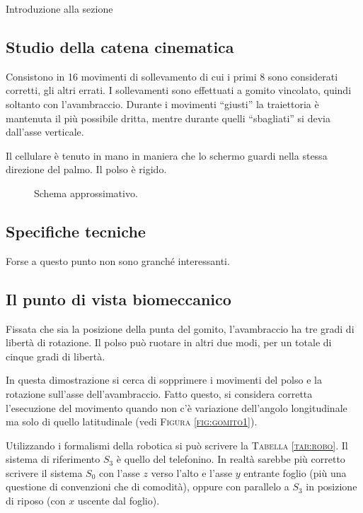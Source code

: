 Introduzione alla sezione

\subsection{Studio della catena cinematica}
\label{ssez:cat_cine}

Consistono in 16 movimenti di sollevamento
di cui i primi 8 sono considerati corretti,
gli altri errati.
I sollevamenti sono effettuati a gomito vincolato,
quindi soltanto con l'avambraccio.
Durante i movimenti ``giusti'' la traiettoria \`e mantenuta
il pi\`u possibile dritta, mentre durante quelli ``sbagliati''
si devia dall'asse verticale.

Il cellulare \`e tenuto in mano in maniera
che lo schermo guardi nella stessa direzione del palmo.
Il polso \`e rigido.

\begin{figure}
  \centering
	
  \caption{Schema approssimativo.}
  \label{fig:gomito2}
\end{figure}

\subsection{Specifiche tecniche}
Forse a questo punto non sono granch\'e interessanti.

\subsection{Il punto di vista biomeccanico}
Fissata che sia la posizione della punta del gomito,
l'avambraccio ha tre gradi di libert\`a di rotazione.
Il polso pu\`o ruotare in altri due modi,
per un totale di cinque gradi di libert\`a.

In questa dimostrazione si cerca di sopprimere
i movimenti del polso e la rotazione sull'asse dell'avambraccio.
Fatto questo, si considera corretta l'esecuzione del movimento
quando non c'\`e variazione dell'angolo longitudinale
ma solo di quello latitudinale (vedi \textsc{Figura \ref{fig:gomito1}}).

Utilizzando i formalismi della robotica
si pu\`o scrivere la \textsc{Tabella \ref{tab:robo}}.
Il sistema di riferimento $S_{3}$ \`e quello del telefonino.
In realt\`a sarebbe pi\`u corretto scrivere il sistema $S_{0}$
con l'asse $z$ verso l'alto e l'asse $y$ entrante foglio
(pi\`u una questione di convenzioni che di comodit\`a),
oppure con parallelo a $S_{3}$ in posizione di riposo
(con $x$ uscente dal foglio).

